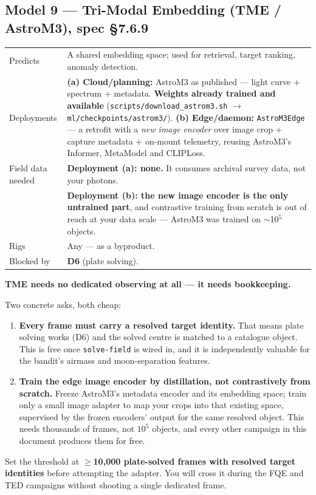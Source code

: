 \documentclass[11pt]{article}
\newcommand{\co}[1]{\texttt{\small #1}}
\begin{document}
\subsection{Model 9 --- Tri-Modal Embedding (TME / AstroM3), spec \S7.6.9}\label{m:tme}

\begin{center}
\small
\begin{tabular}{@{}p{}p{}@{}}
\toprule
Predicts & A shared embedding space; used for retrieval, target ranking, anomaly detection. \\
Deployments & \textbf{(a) Cloud/planning:} AstroM3 as published --- light curve + spectrum + metadata. \textbf{Weights already trained and available} (\co{scripts/download\_astrom3.sh} $\rightarrow$ \co{ml/checkpoints/astrom3/}). \textbf{(b) Edge/daemon:} \co{AstroM3Edge} --- a retrofit with a \emph{new image encoder} over image crop + capture metadata + on-mount telemetry, reusing AstroM3's Informer, MetaModel and CLIPLoss. \\
Field data needed & \textbf{Deployment (a): none.} It consumes archival survey data, not your photons. \\
 & \textbf{Deployment (b): the new image encoder is the only untrained part}, and contrastive training from scratch is out of reach at your data scale --- AstroM3 was trained on $\sim$10$^5$ objects. \\
Rigs & Any --- as a byproduct. \\
Blocked by & \textbf{D6} (plate solving). \\
\bottomrule
\end{tabular}
\end{center}

\begin{keybox}
\textbf{TME needs no dedicated observing at all --- it needs bookkeeping.}

Two concrete asks, both cheap:

\begin{enumerate}
\item \textbf{Every frame must carry a resolved target identity.} That means
      plate solving works (D6) and the solved centre is matched to a catalogue
      object. This is free once \co{solve-field} is wired in, and it is
      independently valuable for the bandit's airmass and moon-separation
      features.
\item \textbf{Train the edge image encoder by distillation, not contrastively
      from scratch.} Freeze AstroM3's metadata encoder and its embedding space;
      train only a small image adapter to map your crops into that existing
      space, supervised by the frozen encoders' output for the same resolved
      object. This needs thousands of frames, not $10^5$ objects, and every
      other campaign in this document produces them for free.
\end{enumerate}

Set the threshold at \textbf{$\geq$10,000 plate-solved frames with resolved
target identities} before attempting the adapter. You will cross it during the
FQE and TED campaigns without shooting a single dedicated frame.
\end{keybox}
\end{document}
